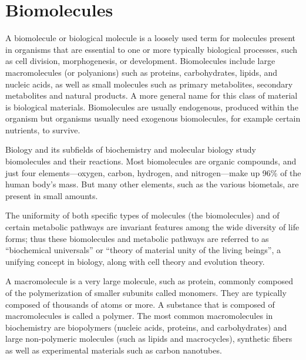 \twocolumn

\hypertarget{biomolecules}{%
\section{Biomolecules}\label{biomolecules}}

A biomolecule or biological molecule is a loosely used term for molecules present in organisms that are essential to one or more typically biological processes, such as cell division, morphogenesis, or development. Biomolecules include large macromolecules (or polyanions) such as proteins, carbohydrates, lipids, and nucleic acids, as well as small molecules such as primary metabolites, secondary metabolites and natural products. A more general name for this class of material is biological materials. Biomolecules are usually endogenous, produced within the organism but organisms usually need exogenous biomolecules, for example certain nutrients, to survive.

Biology and its subfields of biochemistry and molecular biology study biomolecules and their reactions. Most biomolecules are organic compounds, and just four elements---oxygen, carbon, hydrogen, and nitrogen---make up 96\% of the human body's mass. But many other elements, such as the various biometals, are present in small amounts.

The uniformity of both specific types of molecules (the biomolecules) and of certain metabolic pathways are invariant features among the wide diversity of life forms; thus these biomolecules and metabolic pathways are referred to as ``biochemical universals'' or ``theory of material unity of the living beings'', a unifying concept in biology, along with cell theory and evolution theory.

A macromolecule is a very large molecule, such as protein, commonly composed of the polymerization of smaller subunits called monomers. They are typically composed of thousands of atoms or more. A substance that is composed of macromolecules is called a polymer. The most common macromolecules in biochemistry are biopolymers (nucleic acids, proteins, and carbohydrates) and large non-polymeric molecules (such as lipids and macrocycles), synthetic fibers as well as experimental materials such as carbon nanotubes.

